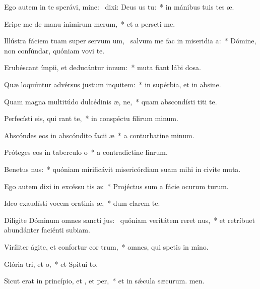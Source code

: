 \item Ego autem in te sperávi, mine:~\pscross{} dixi: Deus us  tu:~* in mánibus tuis tes æ.
\item Eripe me de manu inimirum merum,~* et a perseti me.
\item Illústra fáciem tuam super servum um,~\pscross{} salvum me fac in miseridia a:~* Dómine, non confúndar, quóniam vovi te.
\item Erubéscant ímpii, et deducántur  innum:~* muta fiant lábi dosa.
\item Quæ loquúntur advérsus justum inquitem:~* in supérbia, et in absine.
\item Quam magna multitúdo dulcédinis æ, ne,~* quam abscondísti titi te.
\item Perfecísti eis, qui rant  te,~* in conspéctu filirum minum.
\item Abscóndes eos in abscóndito facii æ~* a conturbatine minum.
\item Próteges eos in taberculo o~* a contradictine linrum.
\item Benetus nus:~* quóniam mirificávit misericórdiam suam mihi in civite muta.
\item Ego autem dixi in excéssu tis æ:~* Projéctus sum a fácie ocurum turum.
\item Ideo exaudísti vocem oratinis æ,~* dum clarem  te.
\item Dilígite Dóminum omnes sancti jus:~\pscross{} quóniam veritátem reret nus,~* et retríbuet abundánter faciénti subiam.
\item Viríliter ágite, et confortur cor trum,~* omnes, qui spetis in mino.
\item Glória tri, et o,~* et Spitui to.
\item Sicut erat in princípio, et , et per,~* et in sǽcula sæcurum. men.
